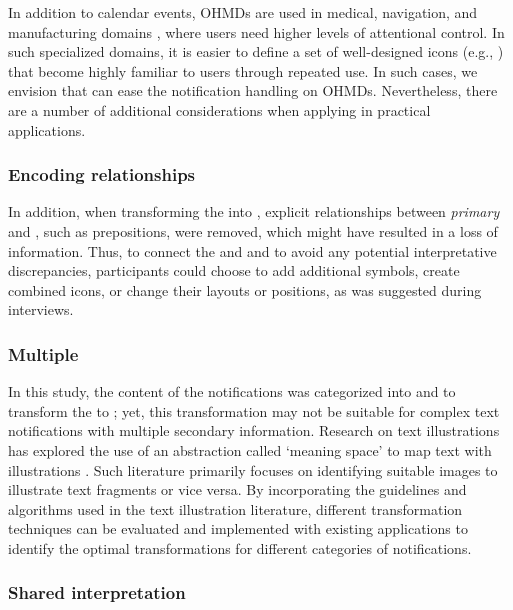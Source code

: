 In addition to calendar events, OHMDs are used in medical, navigation, and manufacturing domains \cite{mitrasinovic_clinical_2015, wang_comprehensive_2016}, where users need higher levels of attentional control. In such specialized domains, it is easier to define a set of well-designed icons (e.g., \cite{bevan2018benefiting}) that become highly familiar to users through repeated use. In such cases, we envision that  can ease the notification handling on OHMDs. Nevertheless, there are a number of additional considerations when applying  in practical applications. 

\subsubsection*{Encoding relationships}

In addition, when transforming the \textformat{} into \iconformat{}, explicit relationships between \textit{primary} and \secondaryinfo{}, such as prepositions, were removed, which might have resulted in a loss of information. Thus, to connect the \primaryinfo{} and \secondaryinfo{} and to avoid any potential interpretative discrepancies, participants could choose to add additional symbols, create combined icons, or change their layouts or positions, as was suggested during interviews.

\subsubsection*{Multiple \secondaryinfo{}}

In this study, the content of the notifications was categorized into \primaryinfo{} and \secondaryinfo{} to transform the \textformat{} to \iconformat{}; yet, this transformation may not be suitable for complex text notifications with multiple secondary information. Research on text illustrations has explored the use of an abstraction called `meaning space' to map text with illustrations \cite{hutchison_every_2010, hutchison_image_2012}. Such literature primarily focuses on identifying suitable images to illustrate text fragments or vice versa. By incorporating the guidelines and algorithms used in the text illustration literature, different transformation techniques can be evaluated and implemented with existing applications to identify the optimal transformations for different categories of notifications.

\subsubsection*{Shared interpretation}

